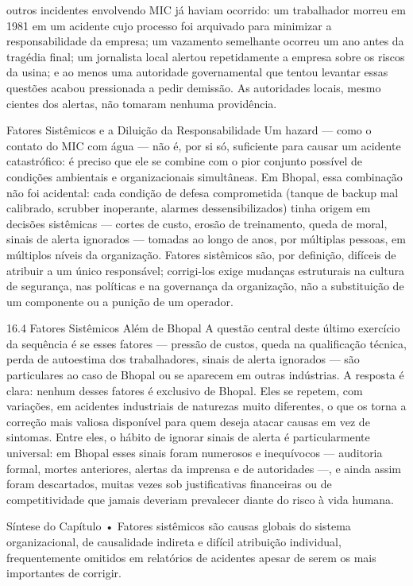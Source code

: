 outros incidentes envolvendo MIC já haviam ocorrido: um trabalhador morreu em 1981 em um acidente cujo processo foi arquivado para minimizar a responsabilidade da empresa; um vazamento semelhante ocorreu um ano antes da tragédia final; um jornalista local alertou repetidamente a empresa sobre os riscos da usina; e ao menos uma autoridade governamental que tentou levantar essas questões acabou pressionada a pedir demissão. As autoridades locais, mesmo cientes dos alertas, não tomaram nenhuma providência.

Fatores Sistêmicos e a Diluição da Responsabilidade Um hazard — como o contato do MIC com água — não é, por si só, suficiente para causar um acidente catastrófico: é preciso que ele se combine com o pior conjunto possível de condições ambientais e organizacionais simultâneas. Em Bhopal, essa combinação não foi acidental: cada condição de defesa comprometida (tanque de backup mal calibrado, scrubber inoperante, alarmes dessensibilizados) tinha origem em decisões sistêmicas — cortes de custo, erosão de treinamento, queda de moral, sinais de alerta ignorados — tomadas ao longo de anos, por múltiplas pessoas, em múltiplos níveis da organização. Fatores sistêmicos são, por definição, difíceis de atribuir a um único responsável; corrigi-los exige mudanças estruturais na cultura de segurança, nas políticas e na governança da organização, não a substituição de um componente ou a punição de um operador.

16.4 Fatores Sistêmicos Além de Bhopal A questão central deste último exercício da sequência é se esses fatores — pressão de custos, queda na qualificação técnica, perda de autoestima dos trabalhadores, sinais de alerta ignorados — são particulares ao caso de Bhopal ou se aparecem em outras indústrias. A resposta é clara: nenhum desses fatores é exclusivo de Bhopal. Eles se repetem, com variações, em acidentes industriais de naturezas muito diferentes, o que os torna a correção mais valiosa disponível para quem deseja atacar causas em vez de sintomas. Entre eles, o hábito de ignorar sinais de alerta é particularmente universal: em Bhopal esses sinais foram numerosos e inequívocos — auditoria formal, mortes anteriores, alertas da imprensa e de autoridades —, e ainda assim foram descartados, muitas vezes sob justificativas financeiras ou de competitividade que jamais deveriam prevalecer diante do risco à vida humana.

Síntese do Capítulo • Fatores sistêmicos são causas globais do sistema organizacional, de causalidade indireta e difícil atribuição individual, frequentemente omitidos em relatórios de acidentes apesar de serem os mais importantes de corrigir.

